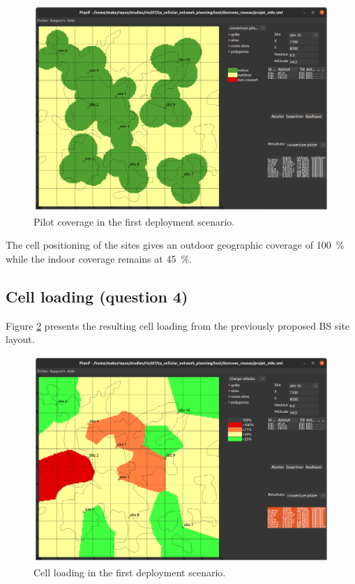 \documentclass{article}
\begin{document}
\begin{figure}[!htb]
    \centering
    \includegraphics[width=12cm]{images/q3_pilot_coverage.png}
    \caption{Pilot coverage in the first deployment scenario.}
    \label{fig:q3_pilot_coverage}
\end{figure}

The cell positioning of the sites gives an outdoor geographic coverage of 100\ \% while the indoor coverage remains at 45\ \%.

\newpage
\subsection{Cell loading (question 4)}
Figure \ref{fig:q4_cell_loading} presents the resulting cell loading from the previously proposed BS site layout.

\begin{figure}[!htb]
    \centering
    \includegraphics[width=12cm]{images/q4_cell_loading.png}
    \caption{Cell loading in the first deployment scenario.}
    \label{fig:q4_cell_loading}
\end{figure}
\end{document}

